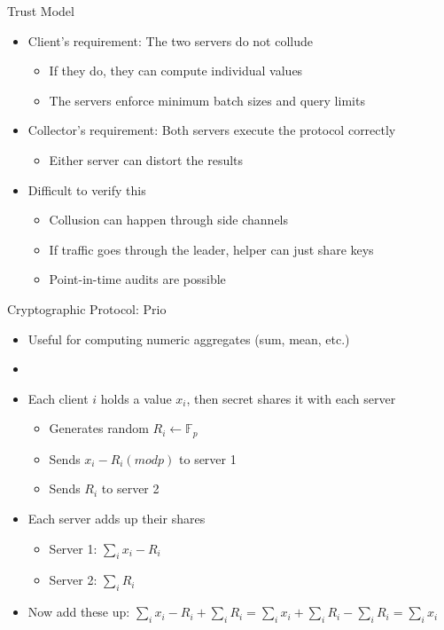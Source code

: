 \documentclass[helvetica]{beamer}
\begin{document}
\begin{frame}{Trust Model}

  \begin{itemize}
  \item Client's requirement: The two servers do not collude
    \begin{itemize}
    \item If they do, they can compute individual values
    \item The servers enforce minimum batch sizes and query limits      
    \end{itemize}

  \item Collector's requirement: Both servers execute the protocol correctly
    \begin{itemize}
    \item Either server can distort the results
    \end{itemize}

  \item Difficult to verify this
    \begin{itemize}
    \item Collusion can happen through side channels
    \item If traffic goes through the leader, helper can just share keys
    \item Point-in-time audits are possible
    \end{itemize}
  \end{itemize}

\end{frame}


\begin{frame}{Cryptographic Protocol: Prio~\cite{201553}}

  \begin{itemize}
  \item Useful for computing numeric aggregates (sum, mean, etc.)
  \item[]
  \item Each client $i$ holds a value $x_i$, then secret shares it with each server
    \begin{itemize}
    \item Generates random $R_i \leftarrow \mathbb{F}_p$
    \item Sends $x_i - R_i (mod p)$ to server 1
    \item Sends $R_i$ to server 2
    \end{itemize}

  \item Each server adds up their shares
    \begin{itemize}
    \item Server 1: $\sum_i x_i - R_i$
    \item Server 2: $\sum_i R_i$
    \end{itemize}

  \item Now add these up: $\sum_i x_i - R_i + \sum_i R_i = \sum_i x_i + \sum_i R_i - \sum_i R_i = \sum_i x_i$
  \end{itemize}
\end{frame}
\end{document}
